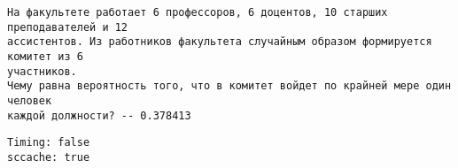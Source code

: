 \documentclass[11pt]{article}
\makeatletter
\newcommand{\boxspacing}{\kern\kvtcb@left@rule\kern\kvtcb@boxsep}
\newcommand{\prompt}[4]{
        {\ttfamily\llap{{\color{#2}[#3]:\hspace{3pt}#4}}\vspace{-\baselineskip}}
    }
\makeatother
\begin{document}
    \begin{Verbatim}[commandchars=\\\{\}]
На факультете работает 6 профессоров, 6 доцентов, 10 старших преподавателей и 12
ассистентов. Из работников факультета случайным образом формируется комитет из 6
участников.
Чему равна вероятность того, что в комитет войдет по крайней мере один человек
каждой должности? -- 0.378413
    \end{Verbatim}

            \begin{tcolorbox}[breakable, size=fbox, boxrule=.5pt, pad at break*=1mm, opacityfill=0]
\prompt{Out}{outcolor}{13}{\boxspacing}
\begin{Verbatim}[commandchars=\\\{\}]
Timing: false
sccache: true

\end{Verbatim}
\end{tcolorbox}
        
\end{document}
